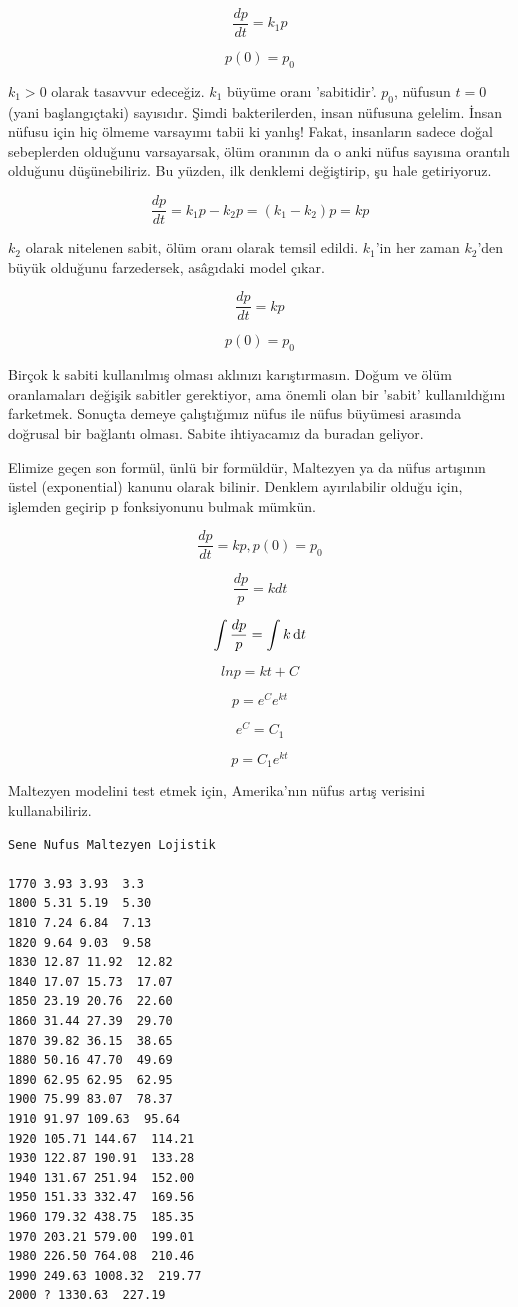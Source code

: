 \documentclass[12pt,fleqn]{article}\usepackage{../../common}
\begin{document}
$$ \frac{dp}{dt} = k_1p$$

$$ p(0) = p_0 $$

$k_1 > 0$ olarak tasavvur edeceğiz. $k_1$ büyüme oranı 'sabitidir'. $p_0$,
nüfusun $t = 0$ (yani başlangıçtaki) sayısıdır. Şimdi bakterilerden, insan
nüfusuna gelelim. İnsan nüfusu için hiç ölmeme varsayımı tabii ki yanlış!
Fakat, insanların sadece doğal sebeplerden olduğunu varsayarsak, ölüm
oranının da o anki nüfus sayısına orantılı olduğunu düşünebiliriz. Bu
yüzden, ilk denklemi değiştirip, şu hale getiriyoruz.

$$ \frac{dp}{dt} = k_1p - k_2p = (k_1-k_2)p = kp$$

$k_2$ olarak nitelenen sabit, ölüm oranı olarak temsil edildi. $k_1$'in her zaman
$k_2$'den büyük olduğunu farzedersek, asâgıdaki model çıkar.

$$ \frac{dp}{dt} = kp $$

$$ p(0) = p_0 $$

Birçok k sabiti kullanılmış olması aklınızı karıştırmasın. Doğum ve ölüm
oranlamaları değişik sabitler gerektiyor, ama önemli olan bir 'sabit'
kullanıldığını farketmek. Sonuçta demeye çalıştığımız nüfus ile nüfus
büyümesi arasında doğrusal bir bağlantı olması. Sabite ihtiyacamız da
buradan geliyor.

Elimize geçen son formül, ünlü bir formüldür, Maltezyen ya da nüfus
artışının üstel (exponential) kanunu olarak bilinir. Denklem ayırılabilir
olduğu için, işlemden geçirip p fonksiyonunu bulmak mümkün.

$$ \frac{dp}{dt} = kp, p(0) = p_0 $$

$$ \frac{dp}{p} = kdt $$

$$ \int \frac{dp}{p} = \int k \,\mathrm{d} t$$

$$ ln p = kt + C $$

$$ p = e^Ce^{kt} $$

$$ e^C = C_1 $$

$$ p = C_1e^{kt} $$

Maltezyen modelini test etmek için, Amerika'nın nüfus artış verisini
kullanabiliriz.

\begin{verbatim}
Sene Nufus Maltezyen Lojistik

1770 3.93 3.93  3.3
1800 5.31 5.19  5.30
1810 7.24 6.84  7.13
1820 9.64 9.03  9.58
1830 12.87 11.92  12.82
1840 17.07 15.73  17.07
1850 23.19 20.76  22.60
1860 31.44 27.39  29.70
1870 39.82 36.15  38.65
1880 50.16 47.70  49.69
1890 62.95 62.95  62.95
1900 75.99 83.07  78.37
1910 91.97 109.63  95.64
1920 105.71 144.67  114.21
1930 122.87 190.91  133.28
1940 131.67 251.94  152.00
1950 151.33 332.47  169.56
1960 179.32 438.75  185.35
1970 203.21 579.00  199.01
1980 226.50 764.08  210.46
1990 249.63 1008.32  219.77
2000 ? 1330.63  227.19
\end{verbatim}
\end{document}
